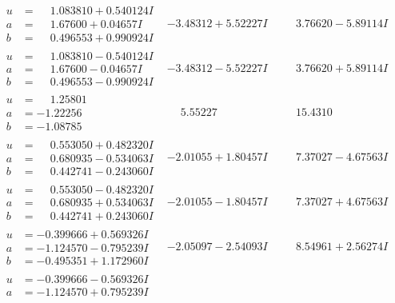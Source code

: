 \documentclass[1p]{elsarticle_modified}
\theoremstyle{definition}
\begin{document}
$$\begin{array}{c|c|c}
\begin{aligned}
u &= \phantom{-}1.083810 + 0.540124 I \\
a &= \phantom{-}1.67600 + 0.04657 I \\
b &= \phantom{-}0.496553 + 0.990924 I\end{aligned}
 & -3.48312 + 5.52227 I & \phantom{-}3.76620 - 5.89114 I \\ \hline\begin{aligned}
u &= \phantom{-}1.083810 - 0.540124 I \\
a &= \phantom{-}1.67600 - 0.04657 I \\
b &= \phantom{-}0.496553 - 0.990924 I\end{aligned}
 & -3.48312 - 5.52227 I & \phantom{-}3.76620 + 5.89114 I \\ \hline\begin{aligned}
u &= \phantom{-}1.25801\phantom{ +0.000000I} \\
a &= -1.22256\phantom{ +0.000000I} \\
b &= -1.08785\phantom{ +0.000000I}\end{aligned}
 & \phantom{-}5.55227\phantom{ +0.000000I} & \phantom{-}15.4310\phantom{ +0.000000I} \\ \hline\begin{aligned}
u &= \phantom{-}0.553050 + 0.482320 I \\
a &= \phantom{-}0.680935 - 0.534063 I \\
b &= \phantom{-}0.442741 - 0.243060 I\end{aligned}
 & -2.01055 + 1.80457 I & \phantom{-}7.37027 - 4.67563 I \\ \hline\begin{aligned}
u &= \phantom{-}0.553050 - 0.482320 I \\
a &= \phantom{-}0.680935 + 0.534063 I \\
b &= \phantom{-}0.442741 + 0.243060 I\end{aligned}
 & -2.01055 - 1.80457 I & \phantom{-}7.37027 + 4.67563 I \\ \hline\begin{aligned}
u &= -0.399666 + 0.569326 I \\
a &= -1.124570 - 0.795239 I \\
b &= -0.495351 + 1.172960 I\end{aligned}
 & -2.05097 - 2.54093 I & \phantom{-}8.54961 + 2.56274 I \\ \hline\begin{aligned}
u &= -0.399666 - 0.569326 I \\
a &= -1.124570 + 0.795239 I \\

\end{aligned}
\end{array}$$
\end{document}
